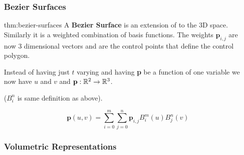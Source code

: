 \documentclass{article}
\begin{document}
\vspace{10px}

\begin{center}
\end{center}

\subsubsection{Bezier Surfaces}

\begin{defin}{thm:bezier-surfaces}
    A \textbf{Bezier Surface} is an extension of  to the 3D space.
    Similarly it is a weighted combination of basis functions. The weights \(\mathbf{p}_{i,j}\) are 
    now 3 dimensional vectors and are the control points that define the control polygon.

    \vspace{10px}

    Instead of having just \(t\) varying and having \textbf{p} be a function of one variable
    we now have \(u\) and \(v\) and \(\mathbf{p}: \mathbb{R}^2 \to \mathbb{R}^3\).
    
    \vspace{5px}

    (\(B_{i}^n\) is same definition as above).

    \[
        \mathbf{p}(u,v) = \sum_{i=0}^m \sum_{j=0}^n \mathbf{p}_{i,j} B_i^m (u) B_j^n (v)
    \]
\end{defin}



\newpage

\subsubsection{Volumetric Representations}
\end{document}
